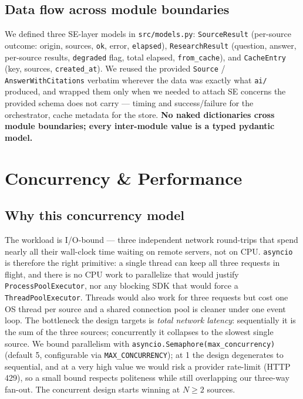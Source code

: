 \documentclass[11pt,a4paper]{article}
\begin{document}
\subsection{Data flow across module boundaries}

We defined three SE-layer models in \texttt{src/models.py}: \texttt{SourceResult} (per-source
outcome: origin, sources, \texttt{ok}, error, \texttt{elapsed}), \texttt{ResearchResult}
(question, answer, per-source results, \texttt{degraded} flag, total elapsed, \texttt{from\_cache}),
and \texttt{CacheEntry} (key, sources, \texttt{created\_at}). We reused the provided
\texttt{Source} / \texttt{AnswerWithCitations} verbatim wherever the data was exactly what
\texttt{ai/} produced, and wrapped them only when we needed to attach SE concerns the provided
schema does not carry --- timing and success/failure for the orchestrator, cache metadata for
the store. \textbf{No naked dictionaries cross module boundaries; every inter-module value is
a typed pydantic model.}

\section{Concurrency \& Performance}\label{sec:concurrency}

\subsection{Why this concurrency model}

The workload is I/O-bound --- three independent network round-trips that spend nearly all
their wall-clock time waiting on remote servers, not on CPU. \texttt{asyncio} is therefore the
right primitive: a single thread can keep all three requests in flight, and there is no CPU
work to parallelize that would justify \texttt{ProcessPoolExecutor}, nor any blocking SDK that
would force a \texttt{ThreadPoolExecutor}. Threads would also work for three requests but cost
one OS thread per source and a shared connection pool is cleaner under one event loop. The
bottleneck the design targets is \emph{total network latency}: sequentially it is the sum of
the three sources; concurrently it collapses to the slowest single source. We bound
parallelism with \texttt{asyncio.Semaphore(max\_concurrency)} (default 5, configurable via
\texttt{MAX\_CONCURRENCY}); at 1 the design degenerates to sequential, and at a very high value
we would risk a provider rate-limit (HTTP 429), so a small bound respects politeness while
still overlapping our three-way fan-out. The concurrent design starts winning at $N\ge2$
sources.
\end{document}
